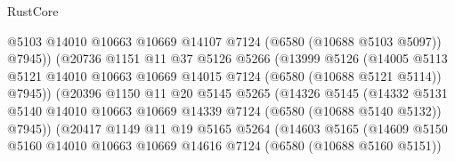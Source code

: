 \begin{lexlean}{RustCore}
\begin{coremodule}
                                  @5103
                                  @14010
                                  @10663
                                  @10669
                                  @14107
                                  @7124
                                  (@6580 (@10688 @5103 @5097))
                                  @7945))
                              (@20736
                                @1151
                                @11
                                @37
                                @5126
                                @5266
                                (@13999
                                  @5126
                                  (@14005
                                    @5113
                                    @5121
                                    @14010
                                    @10663
                                    @10669
                                    @14015
                                    @7124
                                    (@6580 (@10688 @5121 @5114))
                                    @7945))
                                (@20396
                                  @1150
                                  @11
                                  @20
                                  @5145
                                  @5265
                                  (@14326
                                    @5145
                                    (@14332
                                      @5131
                                      @5140
                                      @14010
                                      @10663
                                      @10669
                                      @14339
                                      @7124
                                      (@6580 (@10688 @5140 @5132))
                                      @7945))
                                  (@20417
                                    @1149
                                    @11
                                    @19
                                    @5165
                                    @5264
                                    (@14603
                                      @5165
                                      (@14609
                                        @5150
                                        @5160
                                        @14010
                                        @10663
                                        @10669
                                        @14616
                                        @7124
                                        (@6580 (@10688 @5160 @5151))

\end{coremodule}
\end{lexlean}
